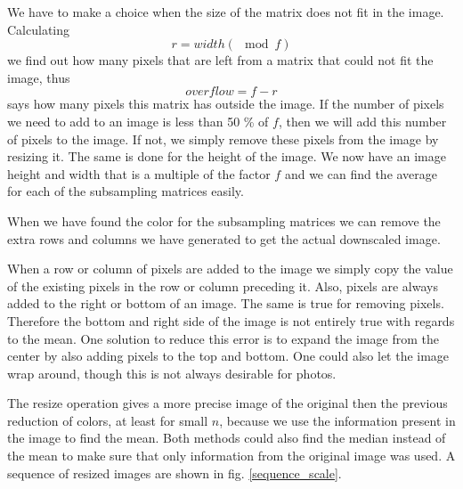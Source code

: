 \documentclass[a4paper, 10pt, final]{article}
\begin{document}
We have to make a choice when the size of the matrix does not fit in the
image. Calculating
\[
r = width (\mod f)
\]
we find out how many pixels that are left from a matrix that could not
fit the image, thus
\[
overflow = f - r
\]
says how many pixels this matrix has outside the image. If the number of
pixels we need to add to an image is less than 50 \% of $f$, then we
will add this number of pixels to the image. If not, we simply remove
these pixels from the image by resizing it. The same is done for the
height of the image. We now have an image height and width that is a
multiple of the factor $f$ and we can find the average for each of the
subsampling matrices easily.

When we have found the color for the subsampling matrices we can remove
the extra rows and columns we have generated to get the actual
downscaled image.

When a row or column of pixels are added to the image we simply copy the
value of the existing pixels in the row or column preceding it. Also,
pixels are always added to the right or bottom of an image. The same is
true for removing pixels. Therefore the bottom and right side of the
image is not entirely true with regards to the mean. One solution to
reduce this error is to expand the image from the center by also
adding pixels to the top and bottom. One could also let the image wrap
around, though this is not always desirable for photos.

The resize operation gives a more precise image of the original then the
previous reduction of colors, at least for small $n$, because we use the
information present in the image to find the mean. Both methods could
also find the median instead of the mean to make sure that only
information from the original image was used. A sequence of resized
images are shown in fig. \ref{sequence_scale}.
\end{document}
